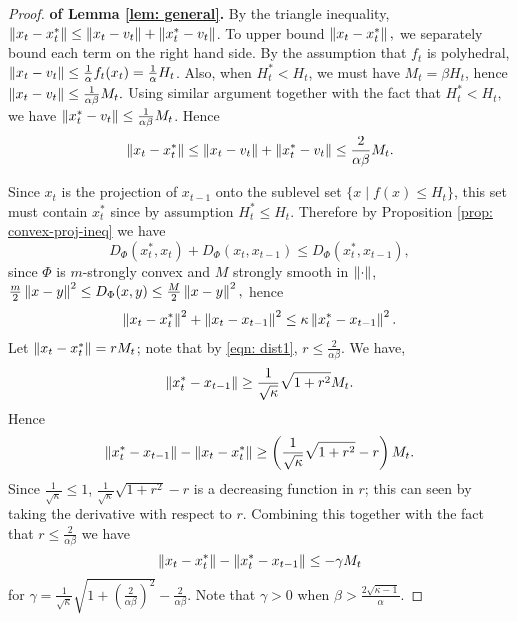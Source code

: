 \begin{proof}{\textbf{of Lemma \ref{lem: general}.}} By the triangle inequality, $\left\lVert x_t - x_t^* \right\rVert \le \left\lVert x_t - v_t \right\rVert + \left\lVert x_t^* - v_t \right\rVert$. To upper bound $\left\lVert x_t - x_t^* \right\rVert,$ we separately bound each term on the right hand side.  By the assumption that $f_t$ is polyhedral, $\left\lVert x_t - v_t \right\rVert \le \frac{1}{\alpha} f_t(x_t) = \frac{1}{\alpha}H_t$. Also, when $H_t^* < H_t$, we must have $M_t = \beta H_t$, hence $\left\lVert x_t - v_t \right\rVert \le \frac{1}{\alpha\beta} M_t.$ Using similar argument together with the fact that $H_t^* < H_t,$ we have $\left\lVert x_t^* - v_t \right\rVert \le \frac{1}{\alpha\beta} M_t$. 
Hence 
\begin{equation}
	\left\lVert x_t - x_t^* \right\rVert \le \left\lVert x_t - v_t \right\rVert + \left\lVert x_t^* - v_t \right\rVert \le \frac{2}{\alpha\beta}M_t.
	\label{eqn: dist1}
\end{equation}

\noindent Since $x_t$ is the projection of $x_{t-1}$ onto the sublevel set $\{x \mid f(x) \le H_t\}$, this set must contain $x_t^*$ since by assumption $H_t^* \le H_t$. Therefore by Proposition \ref{prop: convex-proj-ineq} we have 
\[
 D_\Phi( x_t^*, x_t) + D_\Phi(x_t, x_{t-1}) \le D_\Phi(x_t^*, x_{t-1}), 
 \]
 since $\Phi$ is $m$-strongly convex and $M$ strongly smooth in  $\left\lVert \cdot \right\rVert$, 
$\frac{m}{2}\left\lVert x-y \right\rVert^2 \le D_{\Phi}(x,y) \le \frac{M}{2}\left\lVert x-y \right\rVert^2,$ hence
 \begin{align*}
 \left\lVert x_t - x_t^* \right\rVert^2 + \left\lVert x_t - x_{t-1} \right\rVert^2 \le \kappa \left\lVert x_t^* - x_{t-1} \right\rVert^2.
 \end{align*}
 Let $\left\lVert x_t - x_t^* \right\rVert = r M_t$; note that by \eqref{eqn: dist1}, $r \le \frac{2}{\alpha\beta}$. We have, 
\begin{equation}
	\left\lVert x_t^* - x_{t-1} \right\rVert \ge \frac{1}{\sqrt{\kappa}} \sqrt{ 1 + r^2} M_t.
	\label{eqn: dist2}
\end{equation} 
Hence 
\begin{equation}
\left\lVert x_t^* - x_{t-1} \right\rVert -  \left\lVert x_t - x^*_t \right\rVert \ge \left (\frac{1}{\sqrt{\kappa}} \sqrt{ 1 + r^2}  - r\right) M_t.
\end{equation} Since $\frac{1}{\sqrt{\kappa}} \le 1$, $\frac{1}{\sqrt{\kappa}}\sqrt{ 1 + r^2}  - r$ is a decreasing function in $r$; this can seen by taking the derivative with respect to $r$. Combining this together with the fact that $r \le \frac{2}{\alpha\beta}$ we have $$\left\lVert x_t - x^*_t \right\rVert - \left\lVert x_t^* - x_{t-1} \right\rVert \le -\gamma M_t$$ for $\gamma = \frac{1}{\sqrt{\kappa}}\sqrt{ 1 + \left(\frac{2}{\alpha\beta}\right)^2} - \frac{2}{\alpha\beta}$. Note that $\gamma>0$ when $\beta > \frac{2\sqrt{\kappa-1}}{\alpha}$. 
\end{proof}





